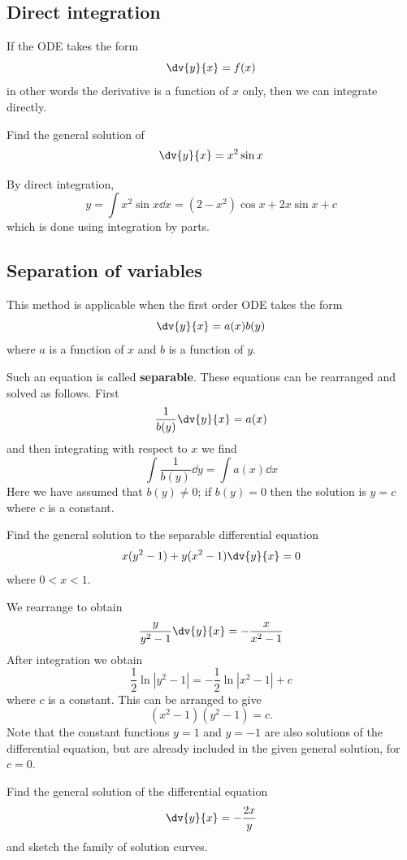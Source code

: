\subsection{Direct integration}
If the ODE takes the form
\[ \dv{y}{x} = f(x) \]
in other words the derivative is a function of $x$ only, then we can integrate directly.

\begin{exercise}
Find the general solution of
\[ \dv{y}{x} = x^2\sin x \]
\end{exercise}

\begin{solution}
By direct integration,
\[ y = \int x^2\sin x \dd{x} = (2-x^2) \cos x + 2x \sin x + c \]
which is done using integration by parts.
\end{solution}

\subsection{Separation of variables}
This method is applicable when the first order ODE takes the form
\[ \dv{y}{x} = a(x)b(y) \]
where $a$ is a function of $x$ and $b$ is a function of $y$. 

Such an equation is called \textbf{separable}. These equations can be rearranged and solved as follows. First
\[ \frac{1}{b(y)}\dv{y}{x} = a(x) \]
and then integrating with respect to $x$ we find
\[ \int \frac{1}{b(y)} \dd{y} = \int a(x) \dd{x} \]
Here we have assumed that $b(y) \neq 0$; if $b(y) = 0$ then the solution is $y = c$ where $c$ is a constant.

\begin{exercise}
Find the general solution to the separable differential equation
\[ x(y^2-1) + y(x^2-1)\dv{y}{x} = 0 \]
where $0<x<1$.
\end{exercise}

\begin{solution}
We rearrange to obtain
\[ \frac{y}{y^2-1}\dv{y}{x} = -\frac{x}{x^2-1} \]
After integration we obtain
\[ \frac{1}{2}\ln|y^2-1| = -\frac{1}{2}\ln|x^2-1| + c \]
where $c$ is a constant. This can be arranged to give
\[ (x^2-1)(y^2-1) = c. \]
Note that the constant functions $y=1$ and $y=-1$ are also solutions of the differential equation, but are already included in the given general solution, for $c=0$.
\end{solution}

\begin{exercise}
Find the general solution of the differential equation 
\[ \dv{y}{x}=-\frac{2x}{y} \]
and sketch the family of solution curves.
\end{exercise}

